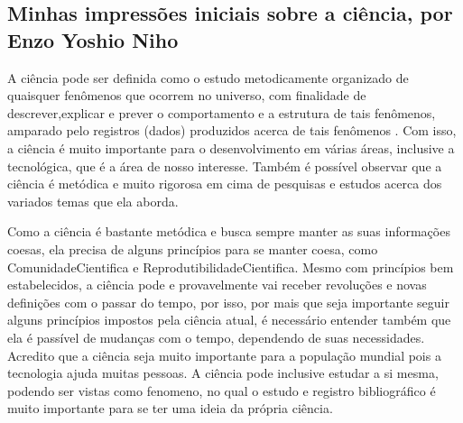 \subsection{Minhas impressões iniciais sobre a ciência, por Enzo Yoshio Niho}

A  ciência  pode  ser  definida  como  o  estudo  metodicamente  organizado  de quaisquer fenômenos que ocorrem no universo, com finalidade de descrever,explicar e prever o comportamento e a estrutura de tais fenômenos, amparado pelo registros (dados) produzidos acerca de tais fenômenos \citep{fernandes_consideracoes_2021}. Com isso, a ciência é muito importante para o desenvolvimento em várias áreas, inclusive a tecnológica, que é a área de nosso interesse. Também é possível observar que a ciência é metódica e muito rigorosa em cima de pesquisas e estudos acerca dos variados temas que ela aborda.

Como a ciência é bastante metódica e busca sempre manter as suas informações coesas, ela precisa de alguns princípios para se manter coesa, como \gls{ComunidadeCientifica} e \gls{ReprodutibilidadeCientifica}. Mesmo com princípios bem estabelecidos, a ciência pode e provavelmente vai receber revoluções e novas definições com o passar do tempo, por isso, por mais que seja importante seguir alguns princípios impostos pela ciência atual, é necessário entender também que ela é passível de mudanças com o tempo, dependendo de suas necessidades. Acredito que a ciência seja muito importante para a população mundial pois a tecnologia ajuda muitas pessoas. A ciência pode inclusive estudar a si mesma, podendo ser vistas como \gls{fenomeno}, no qual o estudo e registro bibliográfico é muito importante para se ter uma ideia da própria ciência.
